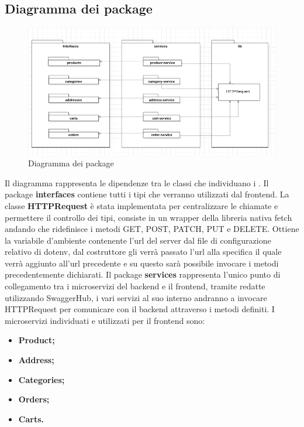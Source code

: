 \subsection{Diagramma dei package}
\begin{figure}[H]
	\centering
	\includegraphics[scale=0.5]{Immagini/Frontend/DiagrammadeiPackage.png}
	\caption{Diagramma dei package}
	\label{fig:fe-packages}
\end{figure}
Il diagramma rappresenta le dipendenze tra le classi che individuano i .
Il package \textbf{interfaces} contiene tutti i tipi che verranno utilizzati dal frontend.
La classe \textbf{HTTPRequest} è stata implementata per centralizzare le chiamate  e permettere il controllo dei tipi, consiste in un wrapper della libreria nativa fetch andando che ridefinisce i metodi GET, POST, PATCH, PUT e DELETE. Ottiene la variabile d'ambiente contenente l'url del server dal file di configurazione relativo di dotenv, dal costruttore gli verrà passato l'url alla specifica  il quale verrà aggiunto all'url precedente e su questo sarà possibile invocare i metodi precedentemente dichiarati.
Il package \textbf{services} rappresenta l'unico punto di collegamento tra i microservizi del backend e il frontend, tramite  redatte utilizzando SwaggerHub, i vari servizi al suo interno andranno a invocare HTTPRequest per comunicare con il backend attraverso i metodi definiti.
I microservizi individuati e utilizzati per il frontend sono:
\begin{itemize}
	\item \textbf{Product;}
	\item \textbf{Address;}
	\item \textbf{Categories;}
	\item \textbf{Orders;}
	\item \textbf{Carts.}
\end{itemize}
